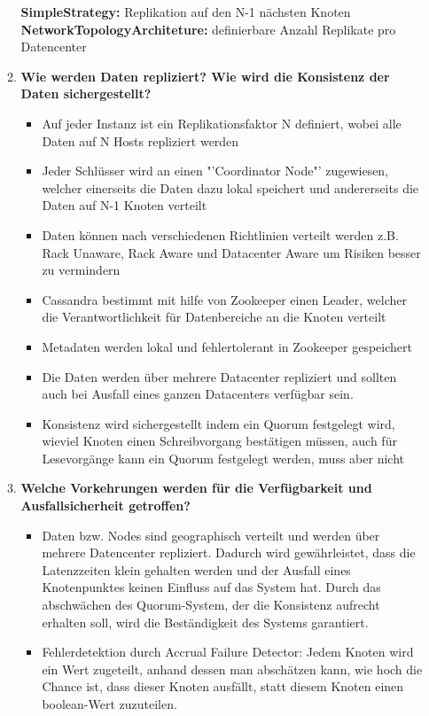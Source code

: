 \documentclass[a4paper,10pt,titlepage=false]{scrreprt}
\begin{document}
\begin{itemize}
\begin{enumerate}
\textbf{SimpleStrategy:} Replikation auf den N-1 nächsten Knoten\\
\textbf{NetworkTopologyArchiteture:} definierbare Anzahl Replikate pro Datencenter\\
\item \textbf{ Wie werden Daten repliziert? Wie wird die Konsistenz der Daten sichergestellt?}\\
\begin{itemize}
  \item Auf jeder Instanz ist ein Replikationsfaktor N definiert, wobei alle Daten auf N Hosts repliziert werden
\item Jeder Schlüsser wird an einen "'Coordinator Node"' zugewiesen, welcher einerseits die Daten dazu lokal speichert und andererseits die Daten auf N-1 Knoten verteilt
\item Daten können nach verschiedenen Richtlinien verteilt werden z.B. Rack Unaware, Rack Aware und Datacenter Aware um Risiken besser zu vermindern
\item Cassandra bestimmt mit hilfe von Zookeeper einen Leader, welcher die Verantwortlichkeit für Datenbereiche an die Knoten verteilt
\item Metadaten werden lokal und fehlertolerant in Zookeeper gespeichert
\item Die Daten werden über mehrere Datacenter repliziert und sollten auch bei Ausfall eines ganzen Datacenters verfügbar sein.
\item Konsistenz wird sichergestellt indem ein Quorum festgelegt wird, wieviel Knoten einen Schreibvorgang bestätigen müssen, auch für Lesevorgänge kann ein Quorum festgelegt werden, muss aber nicht
\end{itemize}
\item \textbf{Welche Vorkehrungen werden für die Verfügbarkeit und Ausfallsicherheit getroffen?} \\
\begin{itemize}
  \item Daten bzw. Nodes sind geographisch verteilt und werden über mehrere Datencenter repliziert. Dadurch wird gewährleistet, dass die Latenzzeiten klein gehalten werden und der Ausfall eines Knotenpunktes keinen Einfluss auf das System hat. Durch das abschwächen des Quorum-System, der die Konsistenz aufrecht erhalten soll, wird die Beständigkeit des Systems garantiert.
\item Fehlerdetektion durch Accrual Failure Detector: Jedem Knoten wird ein Wert zugeteilt, anhand dessen man abschätzen kann, wie hoch die Chance ist, dass dieser Knoten ausfällt, statt diesem Knoten einen boolean-Wert zuzuteilen.

\end{itemize}
\end{enumerate}
\end{itemize}
\end{document}
